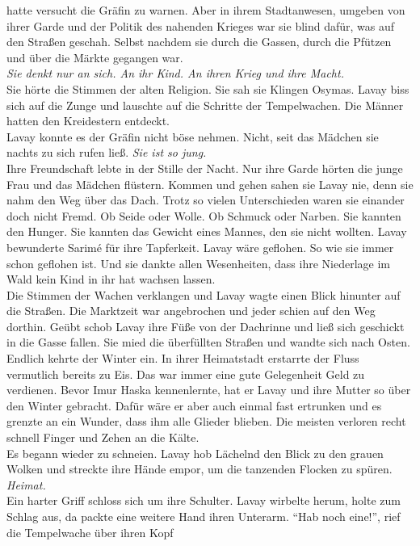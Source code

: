 hatte versucht die Gräfin zu warnen. Aber in ihrem Stadtanwesen, umgeben von ihrer Garde und der 
Politik des nahenden Krieges war sie blind dafür, was auf den Straßen geschah. Selbst nachdem sie 
durch die Gassen, durch die Pfützen und über die Märkte gegangen war.\\
\textit{Sie denkt nur an sich. An ihr Kind. An ihren Krieg und ihre Macht.}\\
Sie hörte die Stimmen der alten Religion. Sie sah sie Klingen Osymas. Lavay biss sich auf die Zunge 
und lauschte auf die Schritte der Tempelwachen. Die Männer 
hatten den Kreidestern entdeckt.\\
Lavay konnte es der Gräfin nicht böse nehmen. Nicht, seit das Mädchen sie nachts zu sich rufen 
ließ. \textit{Sie ist so jung.}\\
Ihre Freundschaft lebte in der Stille der Nacht. Nur ihre Garde hörten die junge Frau und das 
Mädchen flüstern. Kommen und gehen sahen sie Lavay nie, denn sie nahm den Weg über das Dach. Trotz 
so vielen Unterschieden waren sie einander doch nicht Fremd. Ob Seide oder Wolle. Ob Schmuck oder 
Narben. Sie kannten den Hunger. Sie kannten das Gewicht eines Mannes, den sie nicht wollten. Lavay 
bewunderte Sarimé für ihre Tapferkeit. Lavay wäre geflohen. So wie sie immer schon geflohen ist. 
Und sie dankte allen Wesenheiten, dass ihre Niederlage im Wald kein Kind in ihr hat wachsen 
lassen.\\
Die Stimmen der Wachen verklangen und Lavay wagte einen Blick hinunter auf die Straßen. Die 
Marktzeit war angebrochen und jeder schien auf den Weg dorthin. Geübt schob Lavay ihre Füße von der 
Dachrinne und ließ sich geschickt in die Gasse fallen. Sie mied die überfüllten Straßen und wandte 
sich nach Osten. Endlich kehrte der Winter ein. In ihrer Heimatstadt erstarrte der Fluss 
vermutlich bereits zu Eis. Das war immer eine gute Gelegenheit Geld zu verdienen. Bevor Imur Haska 
kennenlernte, hat er Lavay und ihre Mutter so über den Winter gebracht. Dafür wäre er aber auch 
einmal fast ertrunken und es grenzte an ein Wunder, dass ihm alle Glieder blieben. Die meisten 
verloren recht schnell Finger und Zehen an die Kälte.\\
Es begann wieder zu schneien. Lavay hob Lächelnd den Blick zu den grauen Wolken und streckte ihre 
Hände empor, um die tanzenden Flocken zu spüren. \textit{Heimat.}\\
Ein harter Griff schloss sich um ihre Schulter. Lavay wirbelte herum, holte zum Schlag aus, da 
packte eine weitere Hand ihren Unterarm. ``Hab noch eine!'', rief die Tempelwache über ihren Kopf 
